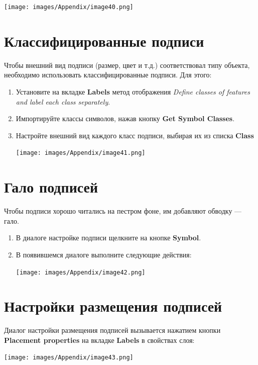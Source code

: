\documentclass[12pt,]{book}
\begin{document}
\texttt{[image: images/Appendix/image40.png]}

\hypertarget{section-25}{%
\section{Классифицированные подписи}\label{section-25}}

Чтобы внешний вид подписи (размер, цвет и т.д.) соответствовал типу объекта, необходимо использовать классифицированные подписи. Для этого:

\begin{enumerate}
\def\labelenumi{\arabic{enumi}.}
\item
  Установите на вкладке \textbf{Labels} метод отображения \emph{Define classes of features and label each class separately}.
\item
  Импортируйте классы символов, нажав кнопку \textbf{Get Symbol Classes}.
\item
  Настройте внешний вид каждого класс подписи, выбирая их из списка \textbf{Class}

  \texttt{[image: images/Appendix/image41.png]}
\end{enumerate}

\hypertarget{section-26}{%
\section{Гало подписей}\label{section-26}}

Чтобы подписи хорошо читались на пестром фоне, им добавляют обводку --- гало.

\begin{enumerate}
\def\labelenumi{\arabic{enumi}.}
\item
  В диалоге настройке подписи щелкните на кнопке \textbf{Symbol}.
\item
  В появившемся диалоге выполните следующие действия:

  \texttt{[image: images/Appendix/image42.png]}
\end{enumerate}

\hypertarget{section-27}{%
\section{Настройки размещения подписей}\label{section-27}}

Диалог настройки размещения подписей вызывается нажатием кнопки \textbf{Placement properties} на вкладке \textbf{Labels} в свойствах слоя:

\texttt{[image: images/Appendix/image43.png]}
\end{document}
